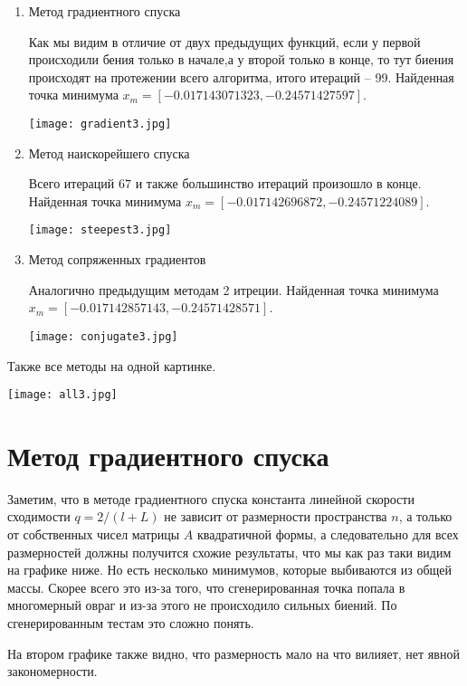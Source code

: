 \begin{enumerate}
    \item Метод градиентного спуска
    
    Как мы видим в отличие от двух предыдущих функций, если у первой происходили бения только в начале,а у
    второй только в конце, то тут биения происходят на протежении всего алгоритма, итого итераций -- 99.
    Найденная точка минимума $x_m = [-0.017143071323, -0.24571427597]$.

    \texttt{[image: gradient3.jpg]}

    \item Метод наискорейшего спуска
    

    Всего итераций $67$ и также большинство итераций произошло в конце.
    Найденная точка минимума $x_m = [-0.017142696872, -0.24571224089]$.
    
    \texttt{[image: steepest3.jpg]}

    \item Метод сопряженных градиентов
    
    Аналогично предыдущим методам 2 итреции.
    Найденная точка минимума $x_m = [-0.017142857143, -0.24571428571]$.

    \texttt{[image: conjugate3.jpg]}

\end{enumerate}

Также все методы на одной картинке.

\texttt{[image: all3.jpg]}

\newpage
\section{Метод градиентного спуска}

Заметим, что в методе градиентного спуска константа линейной скорости сходимости $q = 2/(l + L)$ не зависит
от размерности пространства $n$, а только от собственных чисел матрицы $A$ квадратичной формы, а следовательно
для всех размерностей должны получится схожие результаты, что мы как раз таки видим на графике ниже.
Но есть несколько минимумов, которые выбиваются из общей массы.
 Скорее всего это из-за того, что сгенерированная
точка попала в многомерный овраг и из-за этого не происходило сильных биений. По сгенерированным
тестам это сложно понять.

На втором графике также видно, что размерность мало на что вилияет, нет явной закономерности.


